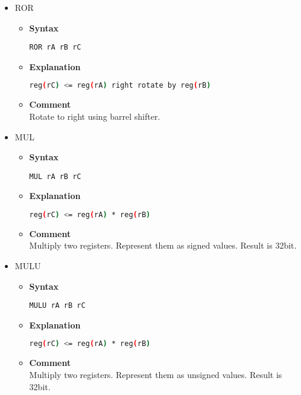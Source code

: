 \begin{itemize}
    \item ROR
    \begin{itemize}
        \item \textbf{Syntax}
        \begin{lstlisting}[language={[markII]Assembler}, frame=single]
    ROR rA rB rC
        \end{lstlisting}
        \item \textbf{Explanation}
        \begin{lstlisting}[language=bash, frame=single]
    reg(rC) <= reg(rA) right rotate by reg(rB)
        \end{lstlisting}
        \item \textbf{Comment} \\
    Rotate to right using barrel shifter.
    \end{itemize}

    \item MUL
    \begin{itemize}
        \item \textbf{Syntax}
        \begin{lstlisting}[language={[markII]Assembler}, frame=single]
    MUL rA rB rC
        \end{lstlisting}
        \item \textbf{Explanation}
        \begin{lstlisting}[language=bash, frame=single]
    reg(rC) <= reg(rA) * reg(rB)
        \end{lstlisting}
        \item \textbf{Comment} \\
        Multiply two registers. Represent them as signed values. Result is 32bit.
    \end{itemize}

    \item MULU
    \begin{itemize}
        \item \textbf{Syntax}
        \begin{lstlisting}[language={[markII]Assembler}, frame=single]
    MULU rA rB rC
        \end{lstlisting}
        \item \textbf{Explanation}
        \begin{lstlisting}[language=bash, frame=single]
    reg(rC) <= reg(rA) * reg(rB)
        \end{lstlisting}
        \item \textbf{Comment} \\
        Multiply two registers. Represent them as unsigned values. Result is 32bit.
    \end{itemize}


\end{itemize}
